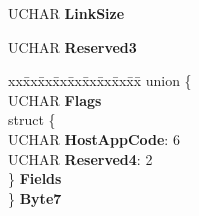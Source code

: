 \begin{DoxyCompactItemize}
\begin{tabbing}
\end{tabbing}\item 
\mbox{\label{struct___m_o_d_e___w_r_i_t_e___p_a_r_a_m_s___p_a_g_e_a50deee5e29ee4bd934169ab0aac71208}} 
U\+C\+H\+AR {\bfseries Link\+Size}
\item 
\mbox{\label{struct___m_o_d_e___w_r_i_t_e___p_a_r_a_m_s___p_a_g_e_a656ef919e90bfbfe76bc8c1facf4b7db}} 
U\+C\+H\+AR {\bfseries Reserved3}
\item 
\mbox{\label{struct___m_o_d_e___w_r_i_t_e___p_a_r_a_m_s___p_a_g_e_a8b9bf2b45f05cf63898bb43d6fff6187}} 
\begin{tabbing}
xx\=xx\=xx\=xx\=xx\=xx\=xx\=xx\=xx\=\kill
union \{\\
\>UCHAR {\bfseries Flags}\\
\>struct \{\\
\>\>UCHAR {\bfseries HostAppCode}: 6\\
\>\>UCHAR {\bfseries Reserved4}: 2\\
\>\} {\bfseries Fields}\\
\} {\bfseries Byte7}\\


\end{tabbing}
\end{DoxyCompactItemize}
